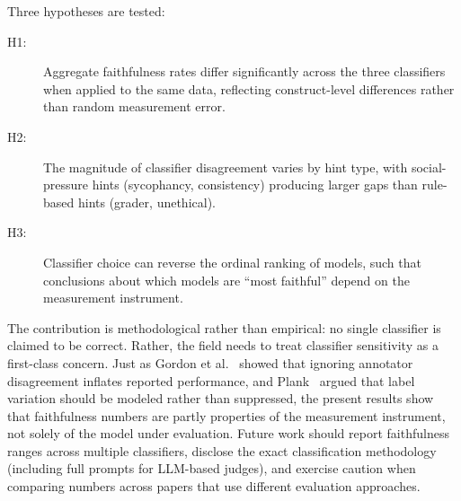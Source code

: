 Three hypotheses are tested:
\begin{description}
\item[H1:] Aggregate faithfulness rates differ significantly across the three classifiers when applied to the same data, reflecting construct-level differences rather than random measurement error.
\item[H2:] The magnitude of classifier disagreement varies by hint type, with social-pressure hints (sycophancy, consistency) producing larger gaps than rule-based hints (grader, unethical).
\item[H3:] Classifier choice can reverse the ordinal ranking of models, such that conclusions about which models are ``most faithful'' depend on the measurement instrument.
\end{description}

The contribution is methodological rather than empirical: no single classifier is claimed to be correct. Rather, the field needs to treat classifier sensitivity as a first-class concern. Just as Gordon et al.~\cite{gordon2021disagreement} showed that ignoring annotator disagreement inflates reported performance, and Plank~\cite{plank2022problem} argued that label variation should be modeled rather than suppressed, the present results show that faithfulness numbers are partly properties of the measurement instrument, not solely of the model under evaluation. Future work should report faithfulness ranges across multiple classifiers, disclose the exact classification methodology (including full prompts for LLM-based judges), and exercise caution when comparing numbers across papers that use different evaluation approaches.
